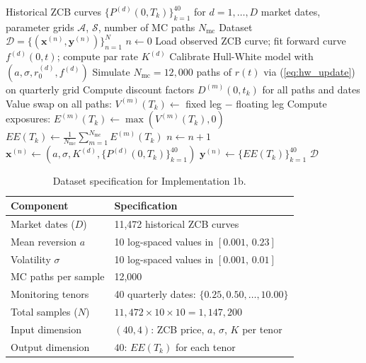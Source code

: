   \begin{algorithm}
  \caption{Dataset Generation for Implementation 1b}\label{alg:datagen_1b}
  \begin{algorithmic}[1]
      \Require Historical ZCB curves $\{P^{(d)}(0, T_k)\}_{k=1}^{40}$ for $d = 1, \ldots, D$ market dates, parameter grids $\mathcal{A}$, $\mathcal{S}$, number of MC paths $N_{\text{mc}}$
      \Ensure Dataset $\mathcal{D} = \{(\mathbf{x}^{(n)}, \mathbf{y}^{(n)})\}_{n=1}^{N}$
      \State $n \leftarrow 0$
          \State Load observed ZCB curve; fit forward curve $f^{(d)}(0, t)$; compute par rate $K^{(d)}$
                  \State Calibrate Hull-White model with $(a, \sigma, r_0^{(d)}, f^{(d)})$
                  \State Simulate $N_{\text{mc}} = 12{,}000$ paths of $r(t)$ via (\ref{eq:hw_update}) on quarterly grid
                  \State Compute discount factors $D^{(m)}(0, t_k)$ for all paths and dates
                      \State Value swap on all paths: $V^{(m)}(T_k) \leftarrow$ fixed leg $-$ floating leg
                      \State Compute exposures: $E^{(m)}(T_k) \leftarrow \max(V^{(m)}(T_k), 0)$
                      \State $EE(T_k) \leftarrow \frac{1}{N_{\text{mc}}} \sum_{m=1}^{N_{\text{mc}}} E^{(m)}(T_k)$
                  \EndFor
                  \State $n \leftarrow n + 1$
                  \State $\mathbf{x}^{(n)} \leftarrow (a, \sigma, K^{(d)}, \{P^{(d)}(0, T_k)\}_{k=1}^{40})$
                  \State $\mathbf{y}^{(n)} \leftarrow \{EE(T_k)\}_{k=1}^{40}$
              \EndFor
          \EndFor
      \EndFor
      \State \Return $\mathcal{D}$
  \end{algorithmic}
  \end{algorithm}

  \begin{table}[htbp]
  \centering
  \caption{Dataset specification for Implementation 1b.}\label{tab:dataset_1b}
  \begin{tabular}{ll}
  \toprule
  \textbf{Component} & \textbf{Specification} \\
  \midrule
  Market dates ($D$) & 11{,}472 historical ZCB curves \\
  Mean reversion $a$ & 10 log-spaced values in $[0.001,\, 0.23]$ \\
  Volatility $\sigma$ & 10 log-spaced values in $[0.001,\, 0.01]$ \\
  MC paths per sample & 12{,}000 \\
  Monitoring tenors & 40 quarterly dates: $\{0.25, 0.50, \ldots, 10.00\}$ \\
  Total samples ($N$) & $11{,}472 \times 10 \times 10 = 1{,}147{,}200$ \\
  Input dimension & $(40, 4)$: ZCB price, $a$, $\sigma$, $K$ per tenor \\
  Output dimension & $40$: $EE(T_k)$ for each tenor \\
  \bottomrule
  \end{tabular}
  \end{table}



